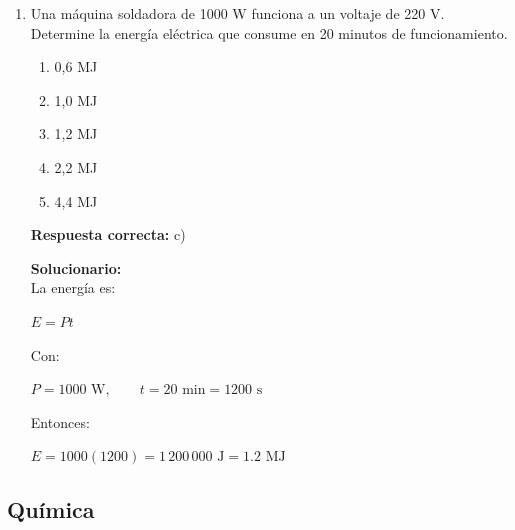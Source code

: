 \begin{enumerate}
	\vspace{2mm}
	\textbf{Solucionario:}\\
	En el punto más alto, la componente vertical es cero y solo queda la horizontal:
	
	$v_x=50\cos53^\circ$
	
	Usando:
	
	$\cos53^\circ=\dfrac35$
	
	se obtiene:
	
	$v_x=50\cdot \dfrac35=30$
	
	\vspace{6mm}
	
	\item Una máquina soldadora de 1000 W funciona a un voltaje de 220 V. Determine la energía eléctrica que consume en 20 minutos de funcionamiento.
	\begin{enumerate}[label=\alph*)]
		\item 0,6 MJ
		\item 1,0 MJ
		\item 1,2 MJ
		\item 2,2 MJ
		\item 4,4 MJ
	\end{enumerate}
	\textbf{Respuesta correcta:} c)
	
	\vspace{2mm}
	\textbf{Solucionario:}\\
	La energía es:
	
	$E=Pt$
	
	Con:
	
	$P=1000\text{ W},\qquad t=20\text{ min}=1200\text{ s}$
	
	Entonces:
	
	$E=1000(1200)=1\,200\,000\text{ J}=1.2\text{ MJ}$
	
	\vspace{6mm}
	
\end{enumerate}

  \subsection*{Química}

